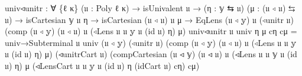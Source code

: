 \documentclass[
  11pt,
  oneside,
  article]{memoir}
\newenvironment{Shaded}{}{}
\newcommand{\NormalTok}[1]{#1}
\newcommand{\OtherTok}[1]{\textcolor[rgb]{0.00,0.44,0.13}{#1}}
\theoremstyle{definition}
\theoremstyle{plain}
\newcommand{\0}{\textsf{0}}
\newcommand{\1}{\tn{\textsf{1}}}
\begin{document}
\begin{Shaded}
\begin{Highlighting}[]
\NormalTok{univ◃unitr }\OtherTok{:} \OtherTok{∀} \OtherTok{\{}\NormalTok{ℓ κ}\OtherTok{\}} \OtherTok{(}\NormalTok{𝔲 }\OtherTok{:}\NormalTok{ Poly ℓ κ}\OtherTok{)} \OtherTok{→}\NormalTok{ isUnivalent 𝔲}
             \OtherTok{→} \OtherTok{(}\NormalTok{η }\OtherTok{:}\NormalTok{ 𝕪 ⇆ 𝔲}\OtherTok{)} \OtherTok{(}\NormalTok{μ }\OtherTok{:} \OtherTok{(}\NormalTok{𝔲 ◃ 𝔲}\OtherTok{)}\NormalTok{ ⇆ 𝔲}\OtherTok{)}
             \OtherTok{→}\NormalTok{ isCartesian 𝕪 𝔲 η }\OtherTok{→}\NormalTok{ isCartesian }\OtherTok{(}\NormalTok{𝔲 ◃ 𝔲}\OtherTok{)}\NormalTok{ 𝔲 μ}
             \OtherTok{→}\NormalTok{ EqLens }\OtherTok{(}\NormalTok{𝔲 ◃ 𝕪}\OtherTok{)}\NormalTok{ 𝔲}
                      \OtherTok{(}\NormalTok{◃unitr 𝔲}\OtherTok{)}
                      \OtherTok{(}\NormalTok{comp }\OtherTok{(}\NormalTok{𝔲 ◃ 𝕪}\OtherTok{)} \OtherTok{(}\NormalTok{𝔲 ◃ 𝔲}\OtherTok{)}\NormalTok{ 𝔲}
                            \OtherTok{(}\NormalTok{◃Lens 𝔲 𝔲 𝕪 𝔲 }\OtherTok{(}\NormalTok{id 𝔲}\OtherTok{)}\NormalTok{ η}\OtherTok{)}\NormalTok{ μ}\OtherTok{)}
\NormalTok{univ◃unitr 𝔲 univ η μ cη cμ }\OtherTok{=}
\NormalTok{    univ→Subterminal }
\NormalTok{        𝔲 univ }\OtherTok{(}\NormalTok{𝔲 ◃ 𝕪}\OtherTok{)} \OtherTok{(}\NormalTok{◃unitr 𝔲}\OtherTok{)} 
        \OtherTok{(}\NormalTok{comp }\OtherTok{(}\NormalTok{𝔲 ◃ 𝕪}\OtherTok{)} \OtherTok{(}\NormalTok{𝔲 ◃ 𝔲}\OtherTok{)}\NormalTok{ 𝔲 }
              \OtherTok{(}\NormalTok{◃Lens 𝔲 𝔲 𝕪 𝔲 }\OtherTok{(}\NormalTok{id 𝔲}\OtherTok{)}\NormalTok{ η}\OtherTok{)}\NormalTok{ μ}\OtherTok{)} 
        \OtherTok{(}\NormalTok{◃unitrCart 𝔲}\OtherTok{)} 
        \OtherTok{(}\NormalTok{compCartesian }\OtherTok{(}\NormalTok{𝔲 ◃ 𝕪}\OtherTok{)} \OtherTok{(}\NormalTok{𝔲 ◃ 𝔲}\OtherTok{)}\NormalTok{ 𝔲 }
                       \OtherTok{(}\NormalTok{◃Lens 𝔲 𝔲 𝕪 𝔲 }\OtherTok{(}\NormalTok{id 𝔲}\OtherTok{)}\NormalTok{ η}\OtherTok{)}\NormalTok{ μ }
                       \OtherTok{(}\NormalTok{◃LensCart 𝔲 𝔲 𝕪 𝔲 }\OtherTok{(}\NormalTok{id 𝔲}\OtherTok{)}\NormalTok{ η }
                                  \OtherTok{(}\NormalTok{idCart 𝔲}\OtherTok{)}\NormalTok{ cη}\OtherTok{)}\NormalTok{ cμ}\OtherTok{)}



\end{Highlighting}
\end{Shaded}
\end{document}
